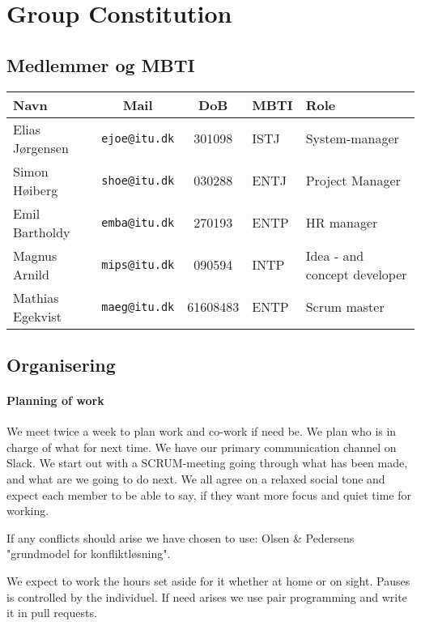 \documentclass[11pt]{article}
\begin{document}
\appendix

\section{Group Constitution}

\subsection{Medlemmer og MBTI}

\begin{table}[h!]
    \centering
    \begin{tabular}{l c c l l}
        \textbf{Navn} & \textbf{Mail} & \textbf{DoB} & \textbf{MBTI} & \textbf{Role} \\ \hline
        Elias Jørgensen & \texttt{ejoe@itu.dk} & 301098 & ISTJ & System-manager\\
        Simon Høiberg & \texttt{shoe@itu.dk} & 030288 & ENTJ & Project Manager \\
        Emil Bartholdy & \texttt{emba@itu.dk} & 270193 & ENTP & HR manager\\
        Magnus Arnild & \texttt{mips@itu.dk} & 090594 & INTP & Idea - and concept developer\\
        Mathias Egekvist & \texttt{maeg@itu.dk} & 61608483 & ENTP & Scrum master \\
    \end{tabular}
\end{table}

\subsection{Organisering}

\paragraph{Planning of work}
We meet twice a week to plan work and co-work if need be. We plan who is in charge of what for next time. We have our primary communication channel on Slack.
We start out with a SCRUM-meeting going through what has been made, and what are we going to do next.
We all agree on a relaxed social tone and expect each member to be able to say, if they want more focus and quiet time for working.

If any conflicts should arise we have chosen to use:
Olsen \& Pedersens "grundmodel for konfliktløsning".

We expect to work the hours set aside for it whether at home or on sight. Pauses is controlled by the individuel. If need arises we use pair programming and write it in pull requests.
\end{document}
